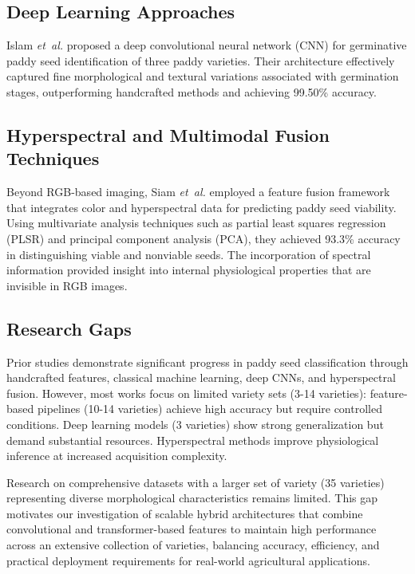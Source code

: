 \documentclass[conference]{IEEEtran}
\begin{document}
\subsection{Deep Learning Approaches}

Islam \textit{et~al.} \cite{islam2023} proposed a deep convolutional neural network (CNN) for germinative paddy seed identification of three paddy varieties. Their architecture effectively captured fine morphological and textural variations associated with germination stages, outperforming handcrafted methods and achieving 99.50\% accuracy. 

\subsection{Hyperspectral and Multimodal Fusion Techniques}

Beyond RGB-based imaging, Siam \textit{et~al.} \cite{Siam2024} employed a feature fusion framework that integrates color and hyperspectral data for predicting paddy seed viability. Using multivariate analysis techniques such as partial least squares regression (PLSR) and principal component analysis (PCA), they achieved 93.3\% accuracy in distinguishing viable and nonviable seeds. The incorporation of spectral information provided insight into internal physiological properties that are invisible in RGB images.

\subsection{ Research Gaps}

Prior studies demonstrate significant progress in paddy seed classification through handcrafted features, classical machine learning, deep CNNs, and hyperspectral fusion. However, most works focus on limited variety sets (3-14 varieties): feature-based pipelines \cite{Uddin2022,https://doi.org/10.1155/2020/7041310} (10-14 varieties) achieve high accuracy but require controlled conditions. Deep learning models \cite{islam2023} (3 varieties) show strong generalization but demand substantial resources. Hyperspectral methods \cite{Siam2024} improve physiological inference at increased acquisition complexity.

Research on comprehensive datasets with a larger set of variety (35 varieties) representing diverse morphological characteristics remains limited. This gap motivates our investigation of scalable hybrid architectures that combine convolutional and transformer-based features to maintain high performance across an extensive collection of varieties, balancing accuracy, efficiency, and practical deployment requirements for real-world agricultural applications.
\end{document}
